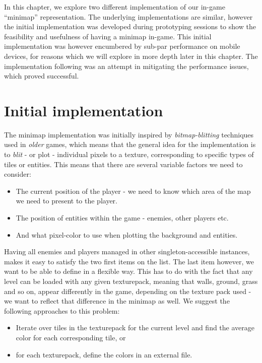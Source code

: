 In this chapter, we explore two different implementation of our in-game
``minimap'' representation. The underlying implementations are similar, however
the initial implementation was developed during prototyping sessions to show
the feasibility and usefulness of having a minimap in-game. This initial
implementation was however encumbered by sub-par performance on mobile devices,
for reasons which we will explore in more depth later in this chapter. The
implementation following was an attempt in mitigating the performance issues,
which proved successful.

\section{Initial implementation}
The minimap implementation was initially inspired by \textit{bitmap-blitting}
techniques used in \textit{older} games, which means that the general idea for
the implementation is to \textit{blit} - or plot - individual pixels to a
texture, corresponding to specific types of tiles or entities. This means that
there are several variable factors we need to consider:

\begin{itemize}
    \item The current position of the player - we need to know which area of
        the map we need to present to the player.
    \item The position of entities within the game - enemies, other players
        etc.
    \item And what pixel-color to use when plotting the background and entities.
\end{itemize}

Having all enemies and players managed in other singleton-accessible instances,
makes it easy to satisfy the two first items on the list. The last item
however, we want to be able to define in a flexible way. This
has to do with the fact that any level can be loaded with any given
texturepack, meaning that walls, ground, grass and so on, appear differently
in the game, depending on the texture pack used - we want to reflect that
difference in the minimap as well. We suggest the following
approaches to this problem:

\begin{itemize}
    \item Iterate over tiles in the texturepack for the current level and find
        the average color for each corresponding tile, or
    \item for each texturepack, define the colors in an external file.
\end{itemize}

